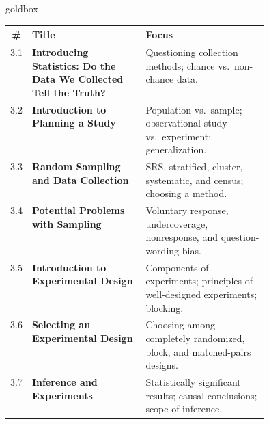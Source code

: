 \documentclass[10pt]{article}
\begin{document}
\renewcommand{\arraystretch}{1.6}
\begin{skillbox}{goldbox}
\begin{tabularx}{\linewidth}{@{} c >{\bfseries}p{0.44\linewidth} X @{}}
  \textbf{\#} & \textbf{Title} & \textbf{Focus} \\
  \hline
  3.1 & Introducing Statistics: Do the Data We Collected Tell the Truth?
    & Questioning collection methods; chance vs.\ non-chance data. \\
  \hline
  3.2 & Introduction to Planning a Study
    & Population vs.\ sample; observational study vs.\ experiment; generalization. \\
  \hline
  3.3 & Random Sampling and Data Collection
    & SRS, stratified, cluster, systematic, and census; choosing a method. \\
  \hline
  3.4 & Potential Problems with Sampling
    & Voluntary response, undercoverage, nonresponse, and question-wording bias. \\
  \hline
  3.5 & Introduction to Experimental Design
    & Components of experiments; principles of well-designed experiments; blocking. \\
  \hline
  3.6 & Selecting an Experimental Design
    & Choosing among completely randomized, block, and matched-pairs designs. \\
  \hline
  3.7 & Inference and Experiments
    & Statistically significant results; causal conclusions; scope of inference. \\
  \hline
\end{tabularx}
\end{skillbox}

\vspace{0.18in}
\end{document}
